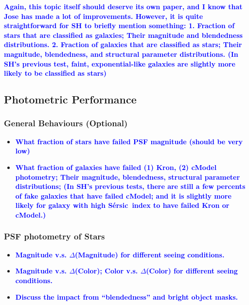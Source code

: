 \documentclass{pasj01}
\def\ser{{S\'{e}rsic\ }}
\newcommand{\plan}[1]{\textcolor{blue} {\textbf{#1}}}
\begin{document}
    \plan{Again, this topic itself should deserve its own paper, and I know that Jose has 
          made a lot of improvements.  
          However, it is quite straightforward for SH to briefly mention something:
              1. Fraction of stars that are classified as galaxies; Their magnitude and 
                 blendedness distributions.
              2. Fraction of galaxies that are classified as stars; Their magnitude, 
                 blendedness, and structural parameter distributions. 
                 (In SH's previous test, faint, exponential-like galaxies are slightly 
                 more likely to be classified as stars)}
    
\subsection{Photometric Performance}

\subsubsection{General Behaviours (Optional)}
    
    \begin{itemize}
        \item \plan{What fraction of stars have failed PSF magnitude (should be very low)}
        \item \plan{What fraction of galaxies have failed (1) Kron, (2) cModel photometry;
                    Their magnitude, blendedness, structural parameter distributions; 
                    (In SH's previous tests, there are still a few percents of fake galaxies 
                     that have failed cModel; and it is slightly more likely for galaxy with 
                     high \ser index to have failed Kron or cModel.)}
    \end{itemize} 
    
\subsubsection{PSF photometry of Stars}

    \begin{itemize}
        \item \plan{Magnitude v.s. $\Delta$(Magnitude) for different seeing conditions.}
        \item \plan{Magnitude v.s. $\Delta$(Color); Color v.s. $\Delta$(Color) for 
                    different seeing conditions.}
        \item \plan{Discuss the impact from ``blendedness'' and bright object masks.}
    \end{itemize} 
\end{document}
